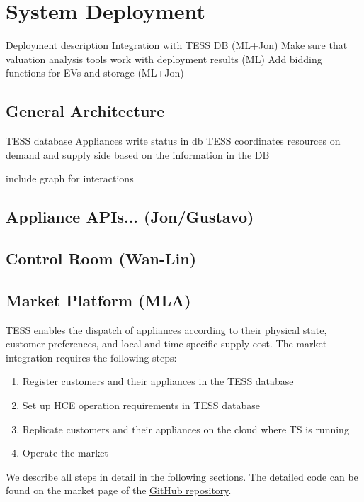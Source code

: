 \chapter{System Deployment}
Deployment description
Integration with TESS DB (ML+Jon)
Make sure that valuation analysis tools work with deployment results (ML)
Add bidding functions for EVs and storage (ML+Jon)

\section{General Architecture}

TESS database
Appliances write status in db
TESS coordinates resources on demand and supply side based on the information in the DB

include graph for interactions

\section{Appliance APIs... (Jon/Gustavo)}

\section{Control Room (Wan-Lin)}

\section{Market Platform (MLA)}

TESS enables the dispatch of appliances according to their physical state, customer preferences, and local and time-specific supply cost. The market integration requires the following steps:

\begin{enumerate}
    \item Register customers and their appliances in the TESS database
    \item Set up HCE operation requirements in TESS database
    \item Replicate customers and their appliances on the cloud where TS is running
    \item Operate the market
\end{enumerate}

We describe all steps in detail in the following sections. The detailed code can be found on the market page of the \href{https://github.com/slacgismo/TESS/tree/master/simulation}{GitHub repository}.

